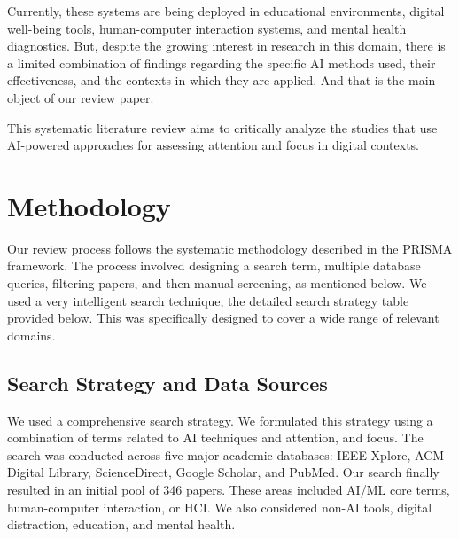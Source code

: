 \documentclass[12pt]{article}
\begin{document}
Currently, these systems are being deployed in educational environments, digital well-being tools, human-computer interaction systems, and mental health diagnostics. But, despite the growing interest in research in this domain, there is a limited combination of findings regarding the specific AI methods used, their effectiveness, and the contexts in which they are applied. And that is the main object of our review paper.

This systematic literature review aims to critically analyze the studies that use AI-powered approaches for assessing attention and focus in digital contexts.

\section{Methodology}
Our review process follows the systematic methodology described in the PRISMA framework. The process involved designing a search term, multiple database queries, filtering papers, and then manual screening, as mentioned below. We used a very intelligent search technique, the detailed search strategy table provided below. This was specifically designed to cover a wide range of relevant domains.

\subsection{Search Strategy and Data Sources} 
We used a comprehensive search strategy. We formulated this strategy using a combination of terms related to AI techniques and attention, and focus. The search was conducted across five major academic databases: IEEE Xplore, ACM Digital Library, ScienceDirect, Google Scholar, and PubMed. Our search finally resulted in an initial pool of 346 papers. These areas included AI/ML core terms, human-computer interaction, or HCI. We also considered non-AI tools, digital distraction, education, and mental health. \\
\end{document}

